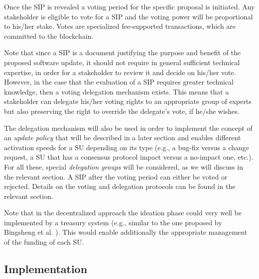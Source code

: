 Once the SIP is revealed a voting period for the specific proposal is initiated. Any stakeholder is eligible to vote for a SIP and the voting power will be proportional to his/her stake. Votes are specialized fee-supported transactions, which are committed to the blockchain.

Note that since a SIP is a document justifying the purpose and benefit of the proposed software update, it should not require in general sufficient technical expertise, in order for a stakeholder to review it and decide on his/her vote. However, in the case that the evaluation of a SIP requires greater technical knowledge, then a voting delegation mechanism exists. This means that a stakeholder can delegate his/her voting rights to an appropriate group of experts but also preserving the right to override the delegate's vote, if he/she wishes. 

The delegation mechanism will also be used in order to implement the concept of an \emph{update policy} that will be described in a later section and enables different activation speeds for a SU depending on its type (e.g., a bug-fix versus a change request, a SU that has a consensus protocol impact versus a no-impact one, etc.). For all these, special \emph{delegation groups} will be considered, as we will discuss in the relevant section. A SIP after the voting period can either be voted or rejected. Details on the voting and delegation protocols can be found in the relevant section.

Note that in the decentralized approach the ideation phase could very well be implemented by a treasury system (e.g., similar to the one proposed by Bingsheng et al. \cite{cryptoeprint:2018:435}). This would enable additionally the appropriate management of the funding of each SU.

\subsection{Implementation}
%

